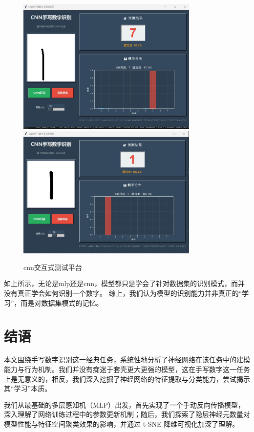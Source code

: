 \documentclass[12pt,a4paper]{article}
\begin{document}
\begin{figure}[H]
    \centering
    \includegraphics[width=0.8\textwidth]{../images/cnn/2025-06-21 063623.jpg}
    \includegraphics[width=0.8\textwidth]{../images/cnn/2025-06-21 063651.jpg}
    \caption{cnn交互式测试平台}
    \label{fig:interactive1}
\end{figure}
如上所示，无论是mlp还是cnn，模型都只是学会了针对数据集的识别模式，而并没有真正学会如何识别一个数字。
综上，我们认为模型的识别能力并非真正的“学习”，而是对数据集模式的记忆。

\section{结语}
本文围绕手写数字识别这一经典任务，系统性地分析了神经网络在该任务中的建模能力与行为机制。我们并没有痴迷于套壳更大更强的模型，这在手写数字这一任务上是无意义的，相反，我们深入挖掘了神经网络的特征提取与分类能力，尝试揭示其“学习”本质。

我们从最基础的多层感知机（MLP）出发，首先实现了一个手动反向传播模型，深入理解了网络训练过程中的参数更新机制；随后，我们探索了隐层神经元数量对模型性能与特征空间聚类效果的影响，并通过 t-SNE 降维可视化加深了理解。
\end{document}

